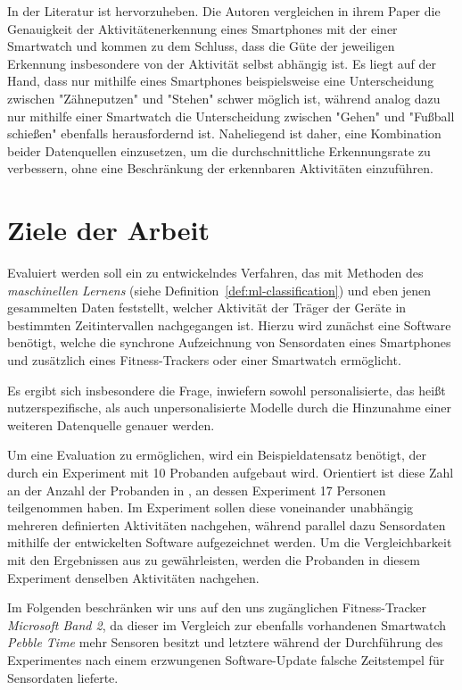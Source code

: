In der Literatur ist \cite{Weiss2016} hervorzuheben. Die Autoren vergleichen in ihrem Paper die Genauigkeit der Aktivitätenerkennung eines Smartphones mit der einer Smartwatch und kommen zu dem Schluss, dass die Güte der jeweiligen Erkennung insbesondere von der Aktivität selbst abhängig ist. Es liegt auf der Hand, dass nur mithilfe eines Smartphones beispielsweise eine Unterscheidung zwischen "Zähneputzen" und "Stehen" schwer möglich ist, während analog dazu nur mithilfe einer Smartwatch die Unterscheidung zwischen "Gehen" und "Fußball schießen" ebenfalls herausfordernd ist. Naheliegend ist daher, eine Kombination beider Datenquellen einzusetzen, um die durchschnittliche Erkennungsrate zu verbessern, ohne eine Beschränkung der erkennbaren Aktivitäten einzuführen.

\section{Ziele der Arbeit} %
\label{sec:goals}
Evaluiert werden soll ein zu entwickelndes Verfahren, das mit Methoden des \textit{maschinellen Lernens} (siehe Definition~\ref{def:ml-classification}) und eben jenen gesammelten Daten feststellt, welcher Aktivität der Träger der Geräte in bestimmten Zeitintervallen nachgegangen ist. Hierzu wird zunächst eine Software benötigt, welche die synchrone Aufzeichnung von Sensordaten eines Smartphones und zusätzlich eines Fitness-Trackers oder einer Smartwatch ermöglicht.

Es ergibt sich insbesondere die Frage, inwiefern sowohl personalisierte, das heißt nutzerspezifische, als auch unpersonalisierte Modelle durch die Hinzunahme einer weiteren Datenquelle genauer werden.

Um eine Evaluation zu ermöglichen, wird ein Beispieldatensatz benötigt, der durch ein Experiment mit 10 Probanden aufgebaut wird. Orientiert ist diese Zahl an der Anzahl der Probanden in \cite{Weiss2016}, an dessen Experiment 17 Personen teilgenommen haben. Im Experiment sollen diese voneinander unabhängig mehreren definierten Aktivitäten nachgehen, während parallel dazu Sensordaten mithilfe der entwickelten Software aufgezeichnet werden. Um die Vergleichbarkeit mit den Ergebnissen aus \cite{Weiss2016} zu gewährleisten, werden die Probanden in diesem Experiment denselben Aktivitäten nachgehen.

Im Folgenden beschränken wir uns auf den uns zugänglichen Fitness-Tracker \textit{Microsoft Band 2}, da dieser im Vergleich zur ebenfalls vorhandenen Smartwatch \textit{Pebble Time} mehr Sensoren besitzt und letztere während der Durchführung des Experimentes nach einem erzwungenen Software-Update falsche Zeitstempel für Sensordaten lieferte. 

